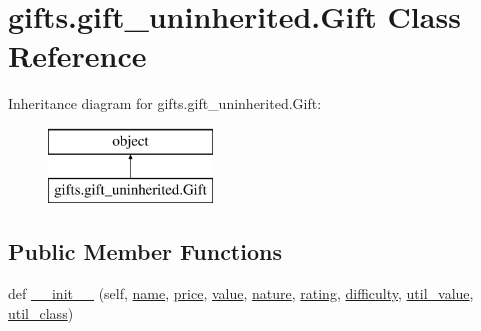 \hypertarget{classgifts_1_1gift__uninherited_1_1_gift}{}\section{gifts.\+gift\+\_\+uninherited.\+Gift Class Reference}
\label{classgifts_1_1gift__uninherited_1_1_gift}
Inheritance diagram for gifts.\+gift\+\_\+uninherited.\+Gift\+:\begin{figure}[H]
\begin{center}
\leavevmode
\includegraphics[height=2.000000cm]{classgifts_1_1gift__uninherited_1_1_gift}
\end{center}
\end{figure}
\subsection*{Public Member Functions}
\begin{DoxyCompactItemize}
\item 
def \hyperlink{classgifts_1_1gift__uninherited_1_1_gift_a78eaebfe6b720d93b8ae2d475a6dd613}{\+\_\+\+\_\+init\+\_\+\+\_\+} (self, \hyperlink{classgifts_1_1gift__uninherited_1_1_gift_abe76c25355d683ddd1e2383f139e4f8e}{name}, \hyperlink{classgifts_1_1gift__uninherited_1_1_gift_a0f92afe5566c82745e3b3759d2e9f775}{price}, \hyperlink{classgifts_1_1gift__uninherited_1_1_gift_aea65e2d06b96ec3ab267e4e8dd1e91ff}{value}, \hyperlink{classgifts_1_1gift__uninherited_1_1_gift_ac21294038fa6ce0cd1a192e303fc1920}{nature}, \hyperlink{classgifts_1_1gift__uninherited_1_1_gift_ae4594046255e648f0496354d1eb540ce}{rating}, \hyperlink{classgifts_1_1gift__uninherited_1_1_gift_ae679bef0b9d26aad227c52602b8575ee}{difficulty}, \hyperlink{classgifts_1_1gift__uninherited_1_1_gift_a640df8d6eb45f9027260eb8053bb6b43}{util\+\_\+value}, \hyperlink{classgifts_1_1gift__uninherited_1_1_gift_a7fd2164d8bd791fa524e82d2ef6316aa}{util\+\_\+class})
\end{DoxyCompactItemize}
